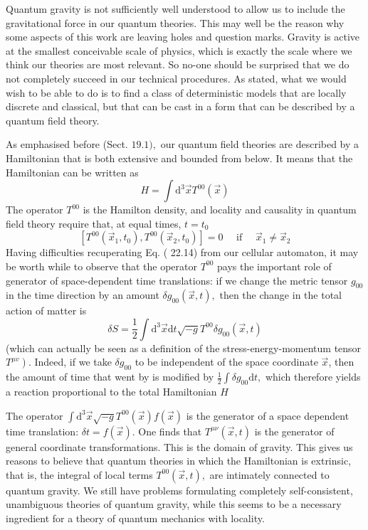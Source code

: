 \documentclass[main.tex]{subfiles}
\begin{document}
Quantum gravity is not sufficiently well understood to allow us to include the gravitational force in our quantum theories. This may well be the reason why some aspects of this work are leaving holes and question marks. Gravity is active at the smallest conceivable scale of physics, which is exactly the scale where we think our theories are most relevant. So no-one should be surprised that we do not completely succeed in our technical procedures. As stated, what we would wish to be able to do is to find a class of deterministic models that are locally discrete and classical, but that can be cast in a form that can be described by a quantum field theory.

As emphasised before (Sect. $19.1),$ our quantum field theories are described by
a Hamiltonian that is both extensive and bounded from below. It means that the Hamiltonian can be written as
$$
H=\int \mathrm{d}^{3} \vec{x} T^{00}(\vec{x})
$$
The operator $T^{00}$ is the Hamilton density, and locality and causality in quantum field theory require that, at equal times, $t=t_{0}$
$$
\left[T^{00}\left(\vec{x}_{1}, t_{0}\right), T^{00}\left(\vec{x}_{2}, t_{0}\right)\right]=0 \quad \text { if } \quad \vec{x}_{1} \neq \vec{x}_{2}
$$
Having difficulties recuperating Eq. ( 22.14) from our cellular automaton, it may be worth while to observe that the operator $T^{00}$ pays the important role of generator of space-dependent time translations: if we change the metric tensor $g_{00}$ in the time direction by an amount $\delta g_{00}(\vec{x}, t),$ then the change in the total action of matter is
$$
\delta S=\frac{1}{2} \int \mathrm{d}^{3} \vec{x} \mathrm{d} t \sqrt{-g} T^{00} \delta g_{00}(\vec{x}, t)
$$
(which can actually be seen as a definition of the stress-energy-momentum tensor $\left.T^{\mu v}\right) .$ Indeed, if we take $\delta g_{00}$ to be independent of the space coordinate $\vec{x}$, then the amount of time that went by is modified by $\frac{1}{2} \int \delta g_{00} \mathrm{d} t,$ which therefore yields a reaction proportional to the total Hamiltonian $H$

The operator $\int \mathrm{d}^{3} \vec{x} \sqrt{-g} T^{00}(\vec{x}) f(\vec{x})$ is the generator of a space dependent time translation: $\delta t=f(\vec{x}) .$ One finds that $T^{\mu \nu}(\vec{x}, t)$ is the generator of general coordinate transformations. This is the domain of gravity. This gives us reasons to believe that quantum theories in which the Hamiltonian is extrinsic, that is, the integral of local terms $T^{00}(\vec{x}, t),$ are intimately connected to quantum gravity. We still have problems formulating completely self-consistent, unambiguous theories of quantum gravity, while this seems to be a necessary ingredient for a theory of quantum mechanics with locality.
\end{document}
